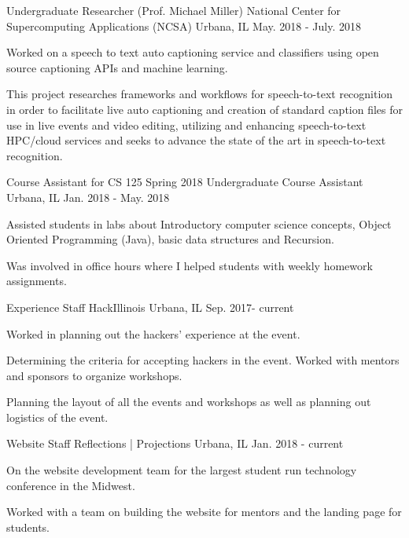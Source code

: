 \begin{cventries}
  
  \cventry
    {Undergraduate Researcher (Prof. Michael Miller)}
    {National Center for Supercomputing Applications (NCSA) }
    {Urbana, IL}
    {May. 2018 - July. 2018}
    {
      \begin{cvitems}
        \item {Worked on a speech to text auto captioning service and classifiers using open source captioning APIs and machine learning.}
        \item {This project researches frameworks and workflows for speech-to-text recognition in order to facilitate live auto captioning and creation of standard caption files for use in live events and video editing, utilizing and enhancing speech-to-text HPC/cloud services and seeks to advance the state of the art in speech-to-text recognition.}
      \end{cvitems} 
    }
    
  \cventry
    {Course Assistant for CS 125 Spring 2018}
    {Undergraduate Course Assistant}
    {Urbana, IL}
    {Jan. 2018 - May. 2018}
    {
      \begin{cvitems}
        \item {Assisted students in labs about Introductory computer science concepts, Object Oriented Programming (Java), basic data structures and Recursion.}
        \item {Was involved in office hours where I helped students with weekly homework assignments.}
      \end{cvitems}
    }
    
  \cventry
    {Experience Staff}
    {HackIllinois}
    {Urbana, IL}
    {Sep. 2017- current}
    {
      \begin{cvitems}
        \item {Worked in planning out the hackers' experience at the event.}
        \item {Determining the criteria for accepting hackers in the event. Worked with mentors and sponsors to organize workshops.}
        \item {Planning the layout of all the events and workshops as well as planning out logistics of the event.}
      \end{cvitems}
    }
  \cventry
    {Website Staff}
    {Reflections | Projections}
    {Urbana, IL}
    {Jan. 2018 - current}
    {
      \begin{cvitems}
        \item {On the website development team for the largest student run technology conference in the Midwest.}
        \item {Worked with a team on building the website for mentors and the landing page for students.}
      \end{cvitems}
    }
    
\end{cventries}
